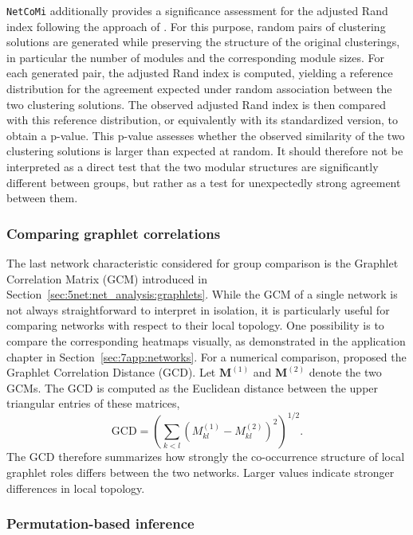 \texttt{NetCoMi} additionally provides a significance assessment for the adjusted Rand index following the approach of \citet{qannari2014significance}. For this purpose, random pairs of clustering solutions are generated while preserving the structure of the original clusterings, in particular the number of modules and the corresponding module sizes. For each generated pair, the adjusted Rand index is computed, yielding a reference distribution for the agreement expected under random association between the two clustering solutions. The observed adjusted Rand index is then compared with this reference distribution, or equivalently with its standardized version, to obtain a p-value. This p-value assesses whether the observed similarity of the two clustering solutions is larger than expected at random. It should therefore not be interpreted as a direct test that the two modular structures are significantly different between groups, but rather as a test for unexpectedly strong agreement between them.

\subsubsection*{Comparing graphlet correlations}

The last network characteristic considered for group comparison is the Graphlet Correlation Matrix (GCM) introduced in Section~\ref{sec:5net:net_analysis:graphlets}. While the GCM of a single network is not always straightforward to interpret in isolation, it is particularly useful for comparing networks with respect to their local topology. One possibility is to compare the corresponding heatmaps visually, as demonstrated in the application chapter in Section~\ref{sec:7app:networks}. For a numerical comparison, \citet{yaveroglu2014revealing} proposed the Graphlet Correlation Distance (GCD). Let $\mathbf{M}^{(1)}$ and $\mathbf{M}^{(2)}$ denote the two GCMs. The GCD is computed as the Euclidean distance between the upper triangular entries of these matrices,
\begin{equation}
\label{eq:5net:net_comparison:gcd}
\mathrm{GCD} = \left(\sum_{k<l}\left(M_{kl}^{(1)} - M_{kl}^{(2)}\right)^2\right)^{1/2}.
\end{equation}
The GCD therefore summarizes how strongly the co-occurrence structure of local graphlet roles differs between the two networks. Larger values indicate stronger differences in local topology.

\subsubsection*{Permutation-based inference}

